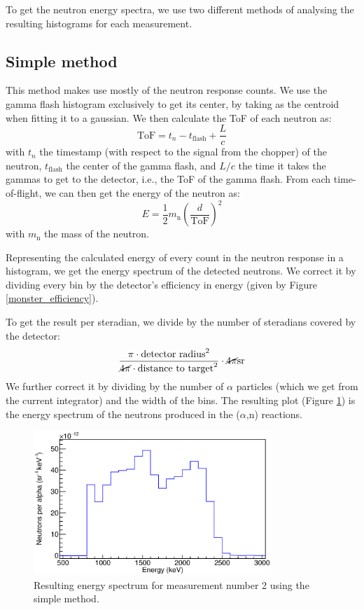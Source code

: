 \documentclass[a4paper,12pt]{report}
\newcommand{\an}{($\alpha$,n) }
\begin{document}
To get the neutron energy spectra, we use two different methods of analysing the resulting histograms for each measurement.

\subsection{Simple method}
This method makes use mostly of the neutron response counts.
We use the gamma flash histogram exclusively to get its center, by taking as the centroid when fitting it to a gaussian.
We then calculate the ToF of each neutron as:
\begin{equation}
	\text{ToF} = t_n-t_\text{flash}+\frac{L}{c}
\end{equation}
with $t_n$ the timestamp (with respect to the signal from the chopper) of the neutron, $t_\text{flash}$ the center of the gamma flash, and $L/c$ the time it takes the gammas to get to the detector, i.e., the ToF of the gamma flash.
From each time-of-flight, we can then get the energy of the neutron as:
\begin{equation}
	E=\frac{1}{2} m_\text{n} \left( \frac{d}{\text{ToF}} \right)^2
\end{equation}
with $m_\text{n}$ the mass of the neutron.

Representing the calculated energy of every count in the neutron response in a histogram, we get the energy spectrum of the detected neutrons.
We correct it by dividing every bin by the detector's efficiency in energy (given by Figure \ref{monster_efficiency}).

To get the result per steradian, we divide by the number of steradians covered by the detector:
\[ \frac{\pi \cdot \text{detector radius}^2}{\cancel{4 \pi} \cdot \text{distance to target}^2}\cdot \cancel{4\pi}\unit{sr}  \]
We further correct it by dividing by the number of $\alpha$ particles (which we get from the current integrator) and the width of the bins.
The resulting plot (Figure \ref{pulsed_energysimple}) is the energy spectrum of the neutrons produced in the \an reactions.

\begin{figure}[H]
	\centering
	\includegraphics[width=0.80\textwidth]{pulsed_energysimple.eps}
	\caption{Resulting energy spectrum for measurement number 2 using the simple method.}
	\label{pulsed_energysimple}
\end{figure}
\end{document}
